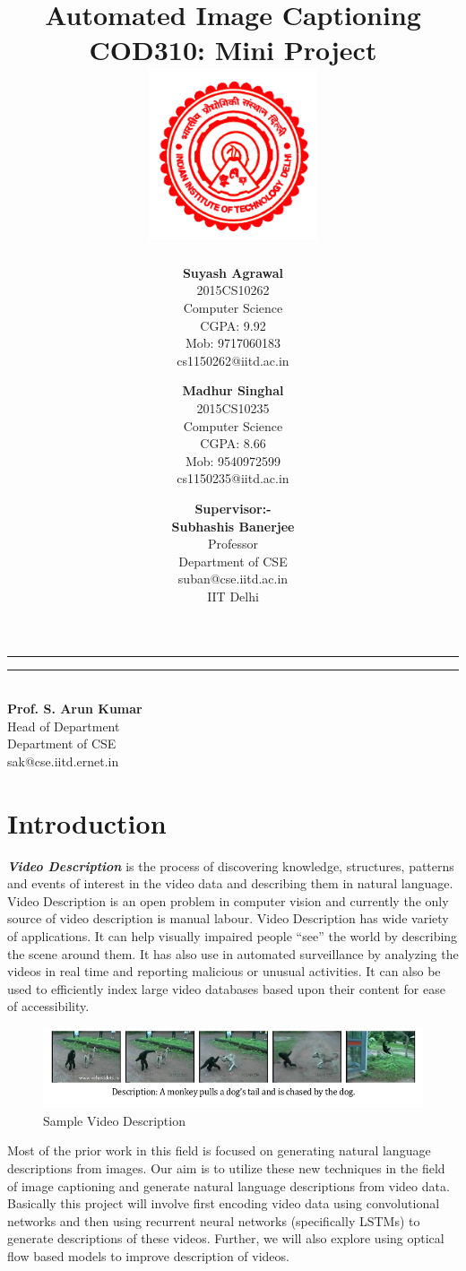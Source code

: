 \documentclass[11pt]{article}
\title{\vspace*{\fill} \textbf{Automated Image Captioning}
	  \\ {\large \textbf{COD310: Mini Project}}
	  \\  \vspace{3mm} \includegraphics[width=5cm]{logo.jpg}}
\author{
	\textbf{Suyash Agrawal}\\ 
	2015CS10262\\
	Computer Science\\
	CGPA: 9.92 \\
	Mob: 9717060183\\
	cs1150262@iitd.ac.in
	\and
	\textbf{Madhur Singhal}\\ 
	2015CS10235\\
	Computer Science\\
	CGPA: 8.66\\
	Mob: 9540972599\\
	cs1150235@iitd.ac.in
}
\date{\textbf{Supervisor:-} \\ \textbf{Subhashis Banerjee} \\ Professor \\ Department of CSE \\ suban@cse.iitd.ac.in\\ IIT Delhi\\
\vspace*{\fill}}
\begin{document}
	\maketitle

\begin{center}
\noindent\rule{3.2cm}{0.4pt} 
\end{center}

\begin{flushright}
\noindent\rule{3.2cm}{0.4pt} 
\\ \textbf{Prof. S. Arun Kumar}
\\ Head of Department
\\ Department of CSE
\\ sak@cse.iitd.ernet.in
\end{flushright}


	\newpage

	\section{Introduction}
		\textit{\textbf{Video Description}} is the process of discovering knowledge, structures, patterns and events of interest in the video data and describing them in natural language. Video Description is an open problem in computer vision and currently the only source of video description is manual labour. 
		\newline
		Video Description has wide variety of applications. It can help visually impaired people ``see'' the world by describing the scene around them. It has also use in automated surveillance by analyzing the videos in real time and reporting malicious or unusual activities. It can also be used to efficiently index large video databases based upon their content for ease of accessibility.

		\begin{figure}[ht!]
		\centering
		\includegraphics[width=1.0\textwidth]{description.png}
		\caption{Sample Video Description\label{fig0}}
		\end{figure}		

		Most of the prior work in this field is focused on generating natural language descriptions from images.\newline
		Our aim is to utilize these new techniques in the field of image captioning and generate natural language descriptions from video data. Basically this project will involve first encoding video data using convolutional networks and then using recurrent neural networks (specifically LSTMs) to generate descriptions of these videos. Further, we will also explore using optical flow based models to improve description of videos.
\end{document}
